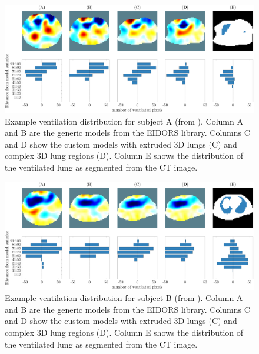 \begin{figure}[H]
	\centering
	\includegraphics[width=\textwidth]{chapter5-CT_to_mesh/imgs/center_of_vent_PT02.pdf}
	\caption[Example ventilation distributions A]{\label{fig:c-of-m-results_a}%
	Example ventilation distribution for subject A (from ).
	Column A and B are the generic models from the EIDORS library. 
	Columns C and D show the custom models with extruded 3D lungs (C) and complex 3D lung regions (D).
	Column E shows the distribution of the ventilated lung as segmented from the CT image. 
	}
\end{figure}

\begin{figure}[H]
	\centering
	\includegraphics[width=\textwidth]{chapter5-CT_to_mesh/imgs/center_of_vent_PT03.pdf}
	\caption[Example ventilation distributions B]{\label{fig:c-of-m-results_b}%
	Example ventilation distribution for subject B (from ).
	Column A and B are the generic models from the EIDORS library. 
	Columns C and D show the custom models with extruded 3D lungs (C) and complex 3D lung regions (D).
	Column E shows the distribution of the ventilated lung as segmented from the CT image. 
	}
\end{figure}

